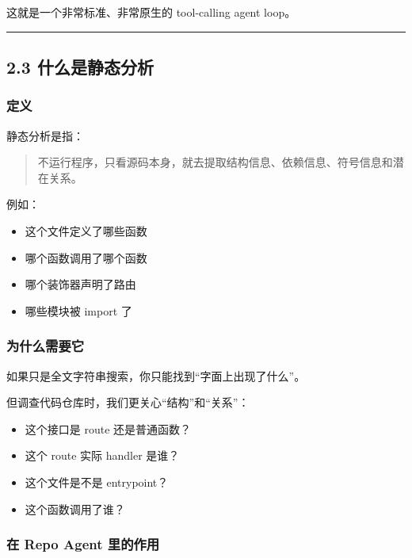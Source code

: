 \documentclass[UTF8,12pt,openany]{ctexbook}
\begin{document}
这就是一个非常标准、非常原生的 tool-calling agent loop。\par

\hrule

\subsection{2.3 什么是静态分析}

\subsubsection{定义}

静态分析是指：\par

\begin{quote}
不运行程序，只看源码本身，就去提取结构信息、依赖信息、符号信息和潜在关系。
\end{quote}

例如：\par

\begin{itemize}
\item 这个文件定义了哪些函数
\item 哪个函数调用了哪个函数
\item 哪个装饰器声明了路由
\item 哪些模块被 import 了
\end{itemize}

\subsubsection{为什么需要它}

如果只是全文字符串搜索，你只能找到“字面上出现了什么”。  \par
但调查代码仓库时，我们更关心“结构”和“关系”：\par

\begin{itemize}
\item 这个接口是 route 还是普通函数？
\item 这个 route 实际 handler 是谁？
\item 这个文件是不是 entrypoint？
\item 这个函数调用了谁？
\end{itemize}

\subsubsection{在 Repo Agent 里的作用}
\end{document}
